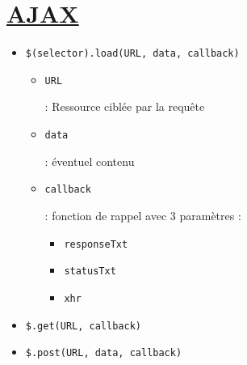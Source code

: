 \hypertarget{ajax11}{%
\section{\texorpdfstring{\href{http://www.w3schools.com/jquery/jquery_ajax_load.asp}{AJAX}}{AJAX}}\label{ajax11}}

\begin{itemize}
\tightlist
\item
  \begin{otherlanguage}{english}\texttt{\$(selector).load(URL,\ data,\ callback)}\end{otherlanguage}

  \begin{itemize}
  \tightlist
  \item
    \begin{otherlanguage}{english}\texttt{URL}\end{otherlanguage} :
    Ressource ciblée par la requête
  \item
    \begin{otherlanguage}{english}\texttt{data}\end{otherlanguage} :
    éventuel contenu
  \item
    \begin{otherlanguage}{english}\texttt{callback}\end{otherlanguage} :
    fonction de rappel avec 3 paramètres :

    \begin{itemize}
    \tightlist
    \item
      \begin{otherlanguage}{english}\texttt{responseTxt}\end{otherlanguage}
    \item
      \begin{otherlanguage}{english}\texttt{statusTxt}\end{otherlanguage}
    \item
      \begin{otherlanguage}{english}\texttt{xhr}\end{otherlanguage}
    \end{itemize}
  \end{itemize}
\item
  \begin{otherlanguage}{english}\texttt{\$.get(URL,\ callback)}\end{otherlanguage}
\item
  \begin{otherlanguage}{english}\texttt{\$.post(URL,\ data,\ callback)}\end{otherlanguage}
\end{itemize}

